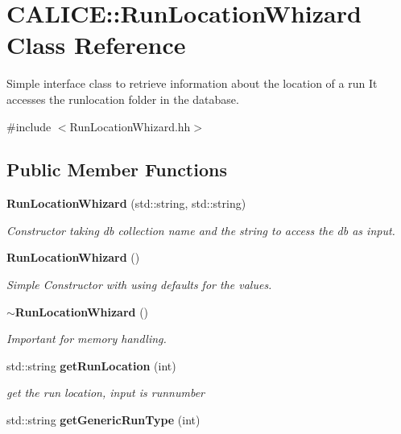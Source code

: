\section{CALICE::RunLocationWhizard Class Reference}
\label{classCALICE_1_1RunLocationWhizard}


Simple interface class to retrieve information about the location of a run It accesses the runlocation folder in the database.  


{\ttfamily \#include $<$RunLocationWhizard.hh$>$}\subsection*{Public Member Functions}
\begin{DoxyCompactItemize}
\item 
{\bf RunLocationWhizard} (std::string, std::string)\label{classCALICE_1_1RunLocationWhizard_a095f755854c8c2fec432ff278f9ba36a}

\begin{DoxyCompactList}\small\item\em Constructor taking db collection name and the string to access the db as input. \item\end{DoxyCompactList}\item 
{\bf RunLocationWhizard} ()\label{classCALICE_1_1RunLocationWhizard_a5f638ca8c316fcd8cb9c0f0f23d05514}

\begin{DoxyCompactList}\small\item\em Simple Constructor with using defaults for the values. \item\end{DoxyCompactList}\item 
{\bf $\sim$RunLocationWhizard} ()\label{classCALICE_1_1RunLocationWhizard_a9de4453338108b8466a145c0604604c4}

\begin{DoxyCompactList}\small\item\em Important for memory handling. \item\end{DoxyCompactList}\item 
std::string {\bf getRunLocation} (int)\label{classCALICE_1_1RunLocationWhizard_a3db0d8e2c9290da2ff053df78a6c1d58}

\begin{DoxyCompactList}\small\item\em get the run location, input is runnumber \item\end{DoxyCompactList}\item 
std::string {\bf getGenericRunType} (int)\label{classCALICE_1_1RunLocationWhizard_a600a0bd53a7bb09075e1ed3c96fa3ee2}


\end{DoxyCompactItemize}

